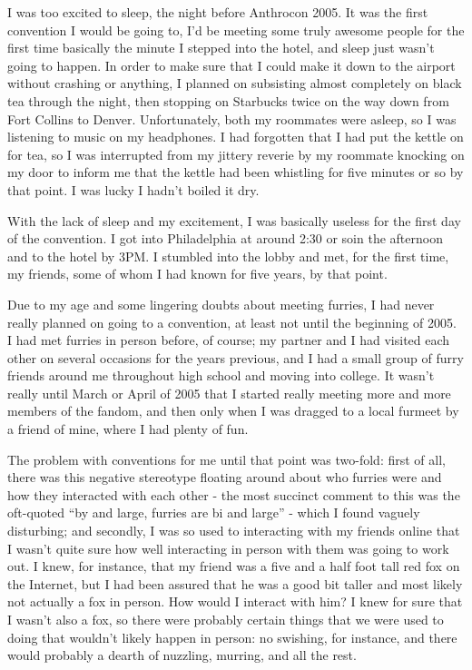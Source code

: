 
I was too excited to sleep, the night before Anthrocon 2005. It was the first convention I would be going to, I'd be meeting some truly awesome people for the first time basically the minute I stepped into the hotel, and sleep just wasn't going to happen. In order to make sure that I could make it down to the airport without crashing or anything, I planned on subsisting almost completely on black tea through the night, then stopping on Starbucks twice on the way down from Fort Collins to Denver. Unfortunately, both my roommates were asleep, so I was listening to music on my headphones. I had forgotten that I had put the kettle on for tea, so I was interrupted from my jittery reverie by my roommate knocking on my door to inform me that the kettle had been whistling for five minutes or so by that point. I was lucky I hadn't boiled it dry.

With the lack of sleep and my excitement, I was basically useless for the first day of the convention. I got into Philadelphia at around 2:30 or soin the afternoon and to the hotel by 3PM. I stumbled into the lobby and met, for the first time, my friends, some of whom I had known for five years, by that point.

Due to my age and some lingering doubts about meeting furries, I had never really planned on going to a convention, at least not until the beginning of 2005. I had met furries in person before, of course; my partner and I had visited each other on several occasions for the years previous, and I had a small group of furry friends around me throughout high school and moving into college. It wasn't really until March or April of 2005 that I started really meeting more and more members of the fandom, and then only when I was dragged to a local furmeet by a friend of mine, where I had plenty of fun.

The problem with conventions for me until that point was two-fold: first of all, there was this negative stereotype floating around about who furries were and how they interacted with each other - the most succinct comment to this was the oft-quoted ``by and large, furries are bi and large'' - which I found vaguely disturbing; and secondly, I was so used to interacting with my friends online that I wasn't quite sure how well interacting in person with them was going to work out. I knew, for instance, that my friend was a five and a half foot tall red fox on the Internet, but I had been assured that he was a good bit taller and most likely not actually a fox in person. How would I interact with him? I knew for sure that I wasn't also a fox, so there were probably certain things that we were used to doing that wouldn't likely happen in person: no swishing, for instance, and there would probably a dearth of nuzzling, murring, and all the rest.

